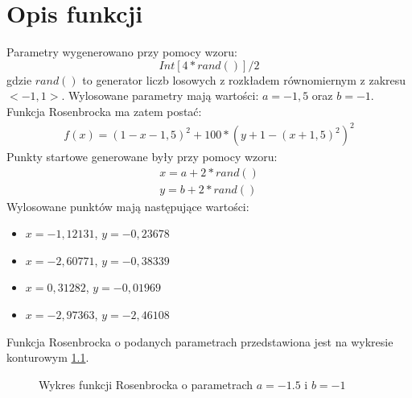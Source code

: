 \chapter{Opis funkcji}
Parametry wygenerowano przy pomocy wzoru:
\begin{equation}
Int[4*rand()]/2
\end{equation}
gdzie $rand()$ to generator liczb losowych z rozkładem równomiernym z zakresu $<-1,1>$.
Wylosowane parametry mają wartości: $a=-1,5$ oraz $b=-1$. Funkcja Rosenbrocka ma zatem postać:
\begin{equation}
\begin{split}
f(x)=(1-x-1,5)^2+100*(y+1-(x+1,5)^2)^2
\end{split}
\end{equation}
Punkty startowe generowane były przy pomocy wzoru:
\begin{equation}
\begin{split}
x=a+2*rand() \\
y=b+2*rand()
\end{split}
\end{equation}
Wylosowane punktów mają następujące wartości:
\begin{itemize}
  \item $x=-1,12131$, $y=-0,23678$
  \item $x=-2,60771$, $y=-0,38339$
  \item $x=0,31282$, $y=-0,01969$
  \item $x=-2,97363$, $y=-2,46108$
\end{itemize}
Funkcja Rosenbrocka o podanych parametrach przedstawiona jest na wykresie konturowym \ref{fig:rosenbrock}.
\begin{figure}
  \centering
  
  \caption{Wykres funkcji Rosenbrocka o parametrach $a=-1.5$ i $b=-1$}
  \label{fig:rosenbrock}
\end{figure}